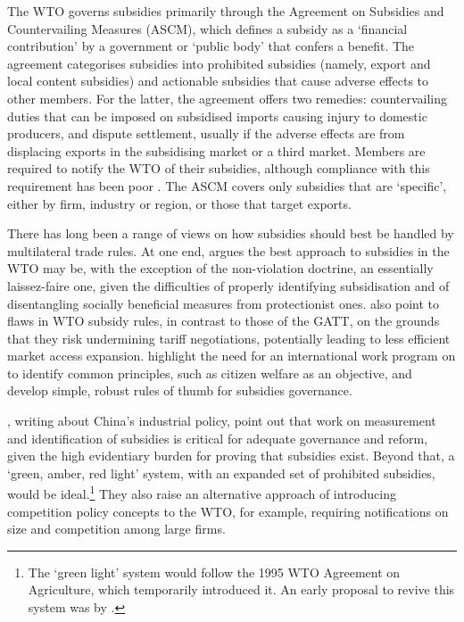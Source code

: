 \documentclass{article}
\begin{document}
The WTO governs subsidies primarily through the Agreement on Subsidies and Countervailing Measures (ASCM), which defines a subsidy as a `financial contribution' by a government or `public body' that confers a benefit. The agreement categorises subsidies into prohibited subsidies (namely, export and local content subsidies) and actionable subsidies that cause adverse effects to other members. For the latter, the agreement offers two remedies: countervailing duties that can be imposed on subsidised imports causing injury to domestic producers, and dispute settlement, usually if the adverse effects are from displacing exports in the subsidising market or a third market. Members are required to notify the WTO of their subsidies, although compliance with this requirement has been poor \parencite[570]{bown_wtoing_2019}. The ASCM covers only subsidies that are `specific', either by firm, industry or region, or those that target exports.

There has long been a range of views on how subsidies should best be handled by multilateral trade rules. At one end, \textcite{sykes_subsidies_2005, sykes_questionable_2010} argues the best approach to subsidies in the WTO may be, with the exception of the non-violation doctrine, an essentially laissez-faire one, given the difficulties of properly identifying subsidisation and of disentangling socially beneficial measures from protectionist ones. \textcite{bagwell_will_2006} also point to flaws in WTO subsidy rules, in contrast to those of the GATT, on the grounds that they risk undermining tariff negotiations, potentially leading to less efficient market access expansion. \textcite{hoekman_rethinking_2020} highlight the need for an international work program on to identify common principles, such as citizen welfare as an objective, and develop simple, robust rules of thumb for subsidies governance.

\textcite{bown_wtoing_2019}, writing about China’s industrial policy, point out that work on measurement and identification of subsidies is critical for adequate governance and reform, given the high evidentiary burden for proving that subsidies exist. Beyond that, a ‘green, amber, red light’ system, with an expanded set of prohibited subsidies, would be ideal.\footnote{The `green light' system would follow the 1995 WTO Agreement on Agriculture, which temporarily introduced it. An early proposal to revive this system was by \textcite{aguayo_ayala_preserving_2005}.} They also raise an alternative approach of introducing competition policy concepts to the WTO, for example, requiring notifications on size and competition among large firms.
\end{document}
